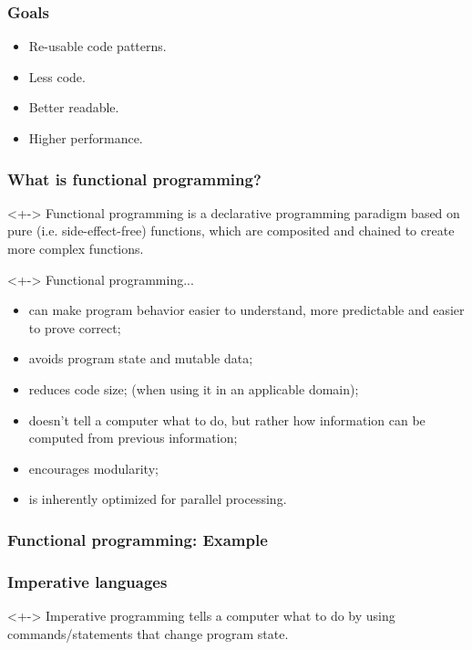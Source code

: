\begin{frame}
	\frametitle{Goals}
	\begin{itemize}[<+-| highlight@+>]
		\item Re-usable code patterns.
		\item Less code.
		\item Better readable.
		\item Higher performance.
	\end{itemize}
\end{frame}


\begin{frame}
	\frametitle{What is functional programming?}
	\begin{block}{}<+->
		Functional programming is a \alert{declarative programming paradigm} based on pure (i.e. side-effect-free) functions, which are composited and chained to create more complex functions.
	\end{block}

	\begin{block}{}<+->
		Functional programming...
		\begin{itemize}[<+-| highlight@+>]
			\item can make program behavior easier to understand, more predictable and easier to prove correct;
			\item avoids program state and mutable data;
			\item reduces code size; (when using it in an applicable domain);
			\item doesn't tell a computer what to do, but rather how information can be computed from previous information;
			\item encourages modularity;
			\item is inherently optimized for parallel processing.
		\end{itemize}
	\end{block}
\end{frame}


\begin{frame}
	\frametitle{Functional programming: Example}
	
\end{frame}


\begin{frame}
	\frametitle{Imperative languages}
	\begin{block}{}<+->
		Imperative programming tells a computer what to do by using commands/statements that \alert{change program state}.
	\end{block}
\end{frame}

